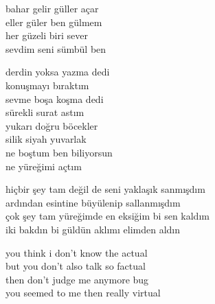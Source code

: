 \documentclass[10pt, openright, oneside]{memoir}
\theoremstyle{definition}
\begin{document}
\vspace*{\fill}
%
\newpage
{}
\vspace*{\fill}
\settowidth{\versewidth}{bahar gelir güller açar}
\begin{cverse}
  bahar gelir güller açar \\
  eller güler ben gülmem \\
  her güzeli biri sever \\
  sevdim seni sümbül ben
\end{cverse}
\vspace*{\fill}
%
\newpage
{}
\vspace*{\fill}
\settowidth{\versewidth}{ne boştum ben biliyorsun}
\begin{cverse}
  derdin yoksa yazma dedi \\
  konuşmayı bıraktım \\
  sevme boşa koşma dedi \\
  sürekli surat astım \\
  yukarı doğru böcekler \\
  silik siyah yuvarlak \\
  ne boştum ben biliyorsun \\
  ne yüreğimi açtım
\end{cverse}
\vspace*{\fill}
%
\newpage
{}
\vspace*{\fill}
\settowidth{\versewidth}{hiçbir şey tam değil de seni yaklaşık sanmışdım}
\begin{cverse}
  hiçbir şey tam değil de seni yaklaşık sanmışdım \\
  ardından esintine büyülenip sallanmışdım \\
  çok şey tam yüreğimde en eksiğim bi sen kaldım \\
  iki bakdın bi güldün aklımı elimden aldın
\end{cverse}
\vspace*{\fill}
%
\newpage
{}
\vspace*{\fill}
\settowidth{\versewidth}{you seemed to me then really virtual}
\begin{cverse}
  you think i don't know the actual \\
  but you don't also talk so factual \\
  then don't judge me anymore bug \\
  you seemed to me then really virtual
\end{cverse}
\end{document}
